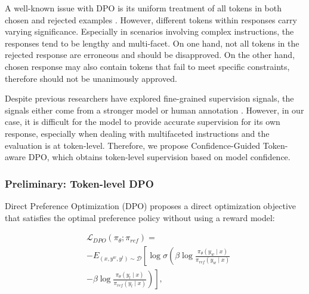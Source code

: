 A well-known issue with DPO is its uniform treatment of all tokens in both chosen and rejected examples \cite{wu2023finegrained, cao2024sparserewardsenhancingreinforcement, li20242ddposcalingdirectpreference}. However, different tokens within responses carry varying significance. Especially in scenarios involving complex instructions, the responses tend to be lengthy and multi-facet. On one hand, not all tokens in the rejected response are erroneous and should be disapproved. On the other hand, chosen response may also contain tokens that fail to meet specific constraints, therefore should not be unanimously approved.

Despite previous researchers have explored fine-grained supervision signals, the signals either come from a stronger model \cite{cao2024sparserewardsenhancingreinforcement, li20242ddposcalingdirectpreference} or human annotation \cite{wu2023finegrained, lightman2023let}. However, in our case, it is difficult for the model to provide accurate supervision for its own response, especially when dealing with multifaceted instructions and the evaluation is at token-level. Therefore, we propose Confidence-Guided Token-aware DPO, which obtains token-level supervision based on model confidence.

\subsubsection{Preliminary: Token-level DPO}
\label{preliminary}
Direct Preference Optimization (DPO) \cite{rafailov2024directpreferenceoptimizationlanguage} proposes a direct optimization objective that satisfies the optimal preference policy without using a reward model:



\vspace{-8mm}

\begin{align}
& \mathcal{L}_{DPO}(\pi_\theta; \pi_{ref}) = \nonumber\\
& -{E}_{\left(x, y^w, y^l \right) \sim \mathcal{D}} \left[ \log \sigma \left( \beta \log \frac{\pi_\theta(y_w \mid x)}{\pi_{ref}(y_w \mid x)} \right. \right. \nonumber\\
& \left. \left. - \beta \log \frac{\pi_\theta(y_l \mid x)}{\pi_{ref}(y_l \mid x)} \right) \right], 
\label{eq:dpo}
\end{align}

